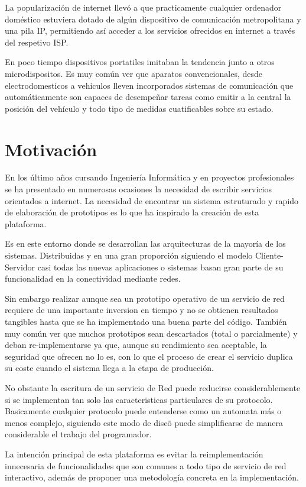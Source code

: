 \documentclass[a4paper,spanish,12pt]{book}
\begin{document}
La popularización de internet llevó a que practicamente cualquier ordenador dom\'estico estuviera dotado de algún dispositivo de comunicación metropolitana y una pila IP, permitiendo así acceder a los servicios ofrecidos en internet a trav\'es del respetivo ISP. 

En poco tiempo dispositivos portatiles imitaban la tendencia junto a otros microdispositos. Es muy común ver que aparatos convencionales, desde electrodomesticos a vehiculos lleven incorporados sistemas de comunicación que automáticamente son capaces de desempeñar tareas como emitir a la central la posición del vehículo y todo tipo de medidas cuatificables sobre su estado. 

\section{Motivación}

En los último años cursando Ingeniería Informática y en proyectos profesionales se ha presentado en numerosas ocasiones la necesidad de escribir servicios orientados a internet. La necesidad de encontrar un sistema estruturado y rapido de elaboración de prototipos es lo que ha inspirado la creación de esta plataforma.

Es en este entorno donde se desarrollan las arquitecturas de la mayor\'ia de los sistemas. Distribuidas y en una gran proporci\'on siguiendo el modelo Cliente-Servidor casi todas las nuevas aplicaciones o sistemas basan gran parte de su funcionalidad en la conectividad mediante redes. 

Sin embargo realizar aunque sea un prototipo operativo de un servicio de red requiere de una importante inversion en tiempo y no se obtienen resultados tangibles hasta que se ha implementado una buena parte del código.
Tambi\'en muy com\'un ver que muchos prototipos sean descartados (total o parcialmente) y deban re-implementarse ya que, aunque su rendimiento sea aceptable, la seguridad que ofrecen no lo es, con lo que el proceso de crear el servicio duplica su coste cuando el sistema llega a la etapa de producci\'on.

No obstante la escritura de un servicio de Red puede reducirse considerablemente si se implementan tan solo las caracteristicas particulares de su protocolo. Basicamente cualquier protocolo puede entenderse como un automata m\'as o menos complejo, siguiendo este modo de dise\~{o} puede simplificarse de manera considerable el trabajo del programador.

La intención principal de esta plataforma es evitar la reimplementación innecesaria de funcionalidades que son comunes a todo tipo de servicio de red interactivo, además de proponer una metodología concreta en la implementación.
\end{document}
